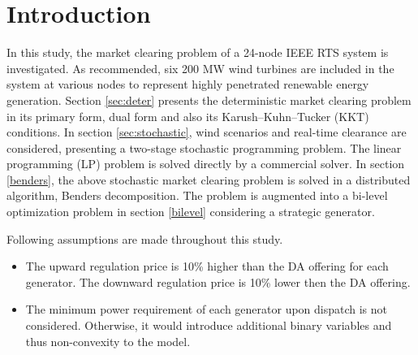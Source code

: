 \section{Introduction}
In this study, the market clearing problem of a 24-node IEEE RTS system \cite{Ordoudis2016} is investigated. As recommended, six 200 MW wind turbines are included in the system at various nodes to represent highly penetrated renewable energy generation. Section \ref{sec:deter} presents the deterministic market clearing problem in its primary form, dual form and also its Karush–Kuhn–Tucker (KKT) conditions. In section \ref{sec:stochastic}, wind scenarios and real-time clearance are considered, presenting a two-stage stochastic programming problem. The linear programming (LP) problem is solved directly by a commercial solver. In section \ref{benders}, the above stochastic market clearing problem is solved in a distributed algorithm, Benders decomposition. The problem is augmented into a bi-level optimization problem in section \ref{bilevel} considering a strategic generator. 

Following assumptions are made throughout this study.
\begin{itemize}
\item The upward regulation price is 10\% higher than the DA offering for each generator. The downward regulation price is 10\% lower then the DA offering.
    \item The minimum power requirement of each generator upon dispatch is not considered. Otherwise, it would introduce additional binary variables and thus non-convexity to the model.
\end{itemize}
